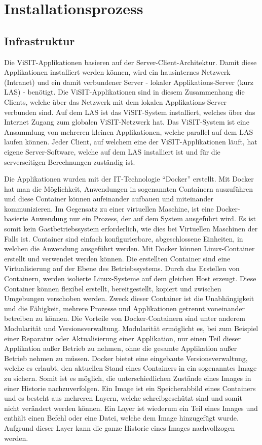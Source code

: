 \section{Installationsprozess}\label{sec:installationsprozess}

\subsection{Infrastruktur}

Die ViSIT-Applikationen basieren auf der Server-Client-Architektur. Damit diese Applikationen installiert werden können, wird ein hausinternes Netzwerk (Intranet) und ein damit verbundener Server - lokaler Applikations-Server (kurz LAS) - benötigt. Die ViSIT-Applikationen sind in diesem Zusammenhang die Clients, welche über das Netzwerk mit dem lokalen Applikations-Server verbunden sind. Auf dem LAS ist das ViSIT-System installiert, welches über das Internet Zugang zum globalen ViSIT-Netzwerk hat.
Das ViSIT-System ist eine Ansammlung von mehreren kleinen Applikationen, welche parallel auf dem LAS laufen können. Jeder Client, auf welchem eine der ViSIT-Applikationen läuft, hat eigene Server-Software, welche auf dem LAS installiert ist und für die serverseitigen Berechnungen zuständig ist.

Die Applikationen wurden mit der IT-Technologie “Docker” erstellt. Mit Docker hat man die Möglichkeit, Anwendungen in sogenannten Containern auszuführen und diese Container können aufeinander aufbauen und miteinander kommunizieren. Im Gegensatz zu einer virtuellen Maschine, ist eine Docker-basierte Anwendung nur ein Prozess, der auf dem System ausgeführt wird. Es ist somit kein Gastbetriebssystem erforderlich, wie dies bei Virtuellen Maschinen der Falls ist. Container sind einfach konfigurierbare, abgeschlossene Einheiten, in welchen die Anwendung ausgeführt werden. 
Mit Docker können Linux-Container erstellt und verwendet werden können. Die erstellten Container sind eine Virtualisierung auf der Ebene des Betriebssystems. Durch das Erstellen von Containern, werden isolierte Linux-Systeme auf dem gleichen Host erzeugt. Diese Container können flexibel erstellt, bereitgestellt, kopiert und zwischen Umgebungen verschoben werden. Zweck dieser Container ist die Unabhängigkeit und die Fähigkeit, mehrere Prozesse und Applikationen getrennt voneinander betreiben zu können. Die Vorteile von Docker-Containern sind unter anderem Modularität und Versionsverwaltung. Modularität ermöglicht es, bei zum Beispiel einer Reparatur oder Aktualisierung einer Applikation, nur einen Teil dieser Applikation außer Betrieb zu nehmen, ohne die gesamte Applikation außer Betrieb nehmen zu müssen. Docker bietet eine eingebaute Versionsverwaltung, welche es erlaubt, den aktuellen Stand eines Containers in ein sogenanntes Image zu sichern. Somit ist es möglich, die unterschiedlichen Zustände eines Images in einer Historie nachzuverfolgen. Ein Image ist ein Speicherabbild eines Containers und es besteht aus mehreren Layern, welche schreibgeschützt sind und somit nicht verändert werden können. Ein Layer ist wiederum ein Teil eines Images und enthält einen Befehl oder eine Datei, welche dem Image hinzugefügt wurde. Aufgrund dieser Layer kann die ganze Historie eines Images nachvollzogen werden.

